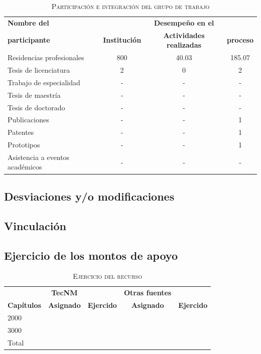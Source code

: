 \documentclass[letterpaper]{elsarticle}
\begin{document}
\begin{table}[h!]
\renewcommand{\arraystretch}{1.3}
\caption{\textsc{Participación e integración del grupo de trabajo}}
\label{tb:grupo}
\centering
\begin{tabular}{lccc}
\bfseries Nombre del  & \bfseries &\bfseries Desempeño en el&\bfseries \\
\bfseries participante & \bfseries Institución &\bfseries Actividades realizadas& \bfseries proceso\\
\hline
Residencias profesionales & 800& 40.03 & 185.07\\
Tesis de licenciatura &2& 0 & 2\\
Trabajo de especialidad& -& - & -\\
Tesis de maestría& -& - & -\\
Tesis de doctorado& -& - & -\\
Publicaciones& - & - & 1\\
Patentes& - & - & 1\\
Prototipos& - & - & 1\\
Asistencia a eventos académicos &- &-&-\\
\hline
\end{tabular}
\end{table}

\subsection{Desviaciones y/o modificaciones}

\subsection{Vinculación}

\subsection{Ejercicio de los montos de apoyo}
\begin{table}[h!]
\renewcommand{\arraystretch}{1.3}
\caption{\textsc{Ejercicio del recurso}}
\label{tb:grupo}
\centering
\begin{tabular}{lcc|cc}  
& \bfseries TecNM & &\bfseries Otras fuentes& \\

\bfseries Capítulos & \bfseries Asignado &\bfseries Ejercido& \bfseries Asignado&\bfseries Ejercido\\
\hline
2000 & & & & \\
3000 & & & & \\
Total & & & & \\
\hline
\end{tabular}
\end{table}
\end{document}
